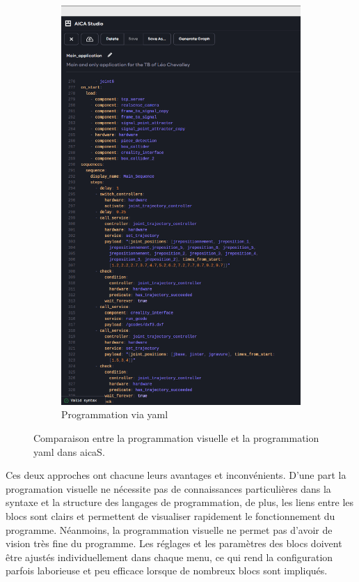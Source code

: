 \begin{figure}[H]
\begin{subfigure}{0.48\textwidth}
        \includegraphics[width=0.95\linewidth]{assets/figures/AICA_Yaml.png}
        \caption{Programmation via \gls{yaml}}
        \label{fig:prog_yaml}
    \end{subfigure}
    \caption{Comparaison entre la programmation visuelle et la programmation \gls{yaml} dans \gls{aicaS}.}
    \label{fig:comparaison_yaml_visuel}
\end{figure}

Ces deux approches ont chacune leurs avantages et inconvénients.
D'une part la programation visuelle ne nécessite pas de connaissances particulières dans la syntaxe et la structure des langages de programmation, de plus, les liens entre les blocs sont clairs et permettent de visualiser rapidement le fonctionnement du programme. Néanmoins, la programmation visuelle ne permet pas d'avoir de vision très fine du programme. Les réglages et les paramètres des blocs doivent être ajustés individuellement dans chaque menu, ce qui rend la configuration parfois laborieuse et peu efficace lorsque de nombreux blocs sont impliqués.

